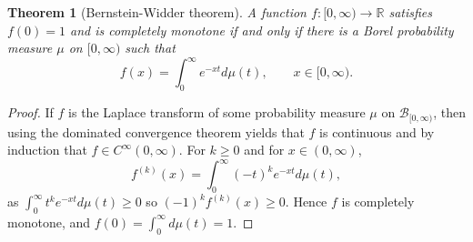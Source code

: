 \documentclass{article}
\newtheorem{theorem}{Theorem}
\theoremstyle{definition}
\begin{document}
\begin{theorem}[Bernstein-Widder theorem]
A function $f:[0,\infty) \to \mathbb{R}$ satisfies $f(0)=1$ and is completely monotone if and only if
there is a Borel probability measure $\mu$ on $[0,\infty)$ such that
\[
f(x) = \int_0^\infty e^{-xt} d\mu(t),\qquad x \in [0,\infty).
\]
\label{bernstein}
\end{theorem}
\begin{proof}
If $f$ is the Laplace transform of some probability measure $\mu$ on $\mathscr{B}_{[0,\infty)}$,
then using the dominated convergence theorem yields that $f$ is continuous and by induction that
$f \in C^\infty(0,\infty)$. For $k \geq 0$ and for $x \in (0,\infty)$,
\[
f^{(k)}(x) = \int_0^\infty (-t)^k e^{-xt} d\mu(t),
\]
as $\int_0^\infty t^k e^{-xt} d\mu(t) \geq 0$ so $(-1)^k f^{(k)}(x) \geq 0$. Hence $f$ is completely monotone,
and $f(0)=\int_0^\infty d\mu(t)=1$. 


\end{proof}
\end{document}
